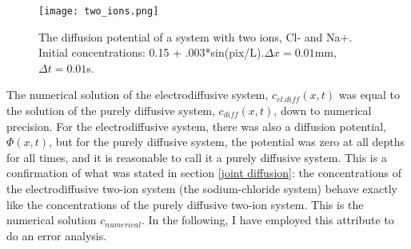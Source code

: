 \documentclass{article}
\begin{document}
\begin{figure}
  \texttt{[image: two\_ions.png]}
  \caption{The diffusion potential of a system with two ions, Cl- and Na+. Initial concentrations: 0.15 + .003*sin(pix/L).$\Delta x = 0.01$mm, $\Delta t = 0.01 $s. }
  \label{fig:two_ions}
\end{figure}

The numerical solution of the electrodiffusive system, $c_{el.diff}(x,t)$ was equal to the solution of the purely diffusive system, $c_{diff}(x,t)$, down to numerical precision. For the electrodiffusive system, there was also a diffusion potential, $\Phi(x,t)$, but for the purely diffusive system, the potential was zero at all depths for all times, and it is reasonable to call it a purely diffusive system. This is a confirmation of what was stated in section \ref{joint diffusion}: the concentrations of the electrodiffusive two-ion system (the sodium-chloride system) behave exactly like the concentrations of the purely diffusive two-ion system. This is the numerical solution $c_{numerical}$. In the following, I have employed this attribute to do an error analysis. 
\end{document}
